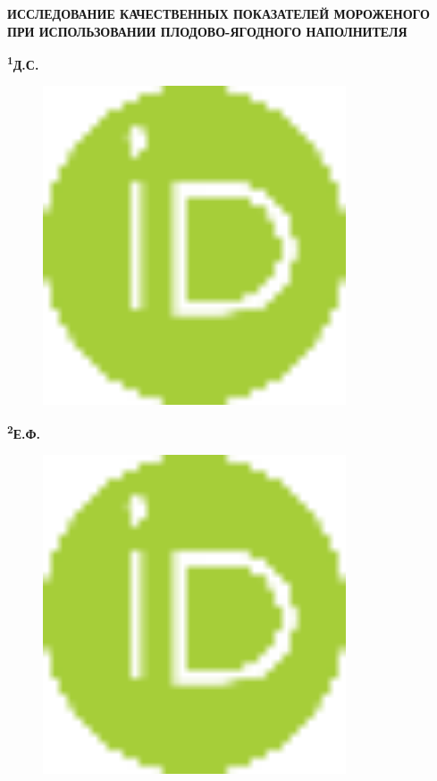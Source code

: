
{\bfseries ИССЛЕДОВАНИЕ КАЧЕСТВЕННЫХ ПОКАЗАТЕЛЕЙ МОРОЖЕНОГО ПРИ
ИСПОЛЬЗОВАНИИ ПЛОДОВО-ЯГОДНОГО НАПОЛНИТЕЛЯ}

{\bfseries \textsuperscript{1}Д.С.
\begin{figure}[H]
	\centering
	\includegraphics[width=0.8\textwidth]{media/pish2/image9}
	\caption*{}
\end{figure}

{\bfseries \textsuperscript{2}Е.Ф.
\begin{figure}[H]
	\centering
	\includegraphics[width=0.8\textwidth]{media/pish2/image9}
	\caption*{}
\end{figure}

}}
